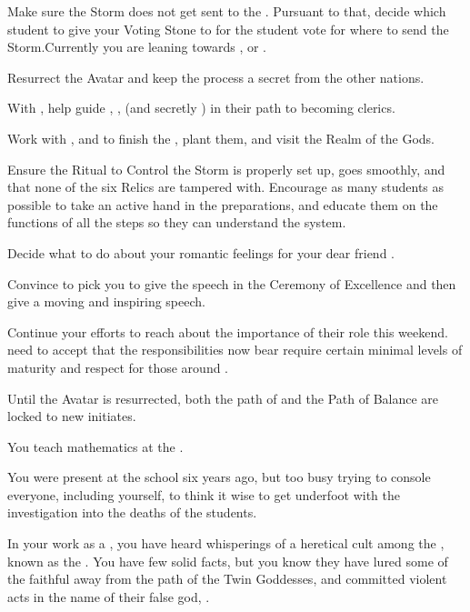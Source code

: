 \documentclass[char]{GL2020}
\begin{document}
\begin{itemz}
    \item Make sure the Storm does not get sent to the \pShip{}. Pursuant to that, decide which student to give your Voting Stone to for the student vote for where to send the Storm.Currently you are leaning towards \cInitiate{}, \cWarlordDaughter{} or \cAmbition{}.
    \item Resurrect the \cEbb{} Avatar and keep the process a secret from the other nations.
    \item With \cEbbPriest{}, help guide \cInitiate{}, \cWarlordDaughter{}, (and secretly \cPirate{}) in their path to becoming clerics.
    \item Work with \cCurse{}, \cAmbition{} and \cAssistantScientist{} to finish the \iBeansMB{}, plant them, and visit the Realm of the Gods.
\end{itemz}

\begin{itemz}
    \item Ensure the Ritual to Control the Storm is properly set up, goes smoothly, and that none of the six Relics are tampered with. Encourage as many students as possible to take an active hand in the preparations, and educate them on the functions of all the steps so they can understand the system.
    \item Decide what to do about your romantic feelings for your dear friend \cMusic{}.
    \item Convince \cMusic{} to pick you to give the speech in the Ceremony of Excellence and then give a moving and inspiring speech.
    \item Continue your efforts to reach \cPirateChild{} about the importance of their role this weekend. \cPirateChild{\They} need\cPirateChild{\verbs} to accept that the responsibilities  now bear\cPirateChild{\verbs} require certain minimal levels of maturity and respect for those around \cPirateChild{\them}.
\end{itemz}

\begin{itemz}[Notes]
    \item Until the \cEbb{} Avatar is resurrected, both the path of \cEbb{} and the Path of Balance are locked to new initiates.
    \item You teach mathematics at the \pSchool{}.
    \item You were present at the school six years ago, but too busy trying to console everyone, including yourself, to think it wise to get underfoot with the investigation into the deaths of the students.
    \item In your work as a \cFlowPriest{\cleric}, you have heard whisperings of a heretical cult among the \pShip{}, known as the \pGoaties{}. You have few solid facts, but you know they have lured some of the faithful away from the path of the Twin Goddesses, and committed violent acts in the name of their false god, \cGenesis{\intro}.
\end{itemz}
\end{document}
